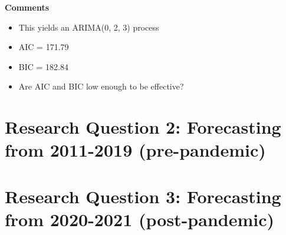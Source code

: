 \documentclass[
]{article}
\providecommand{\tightlist}{%
  \setlength{\itemsep}{0pt}\setlength{\parskip}{0pt}}
\begin{document}
\textbf{Comments}

\begin{itemize}
\tightlist
\item
  This yields an ARIMA(0, 2, 3) process
\item
  AIC = 171.79
\item
  BIC = 182.84
\item
  Are AIC and BIC low enough to be effective?
\end{itemize}

\hypertarget{research-question-2-forecasting-from-2011-2019-pre-pandemic}{%
\section{Research Question 2: Forecasting from 2011-2019
(pre-pandemic)}\label{research-question-2-forecasting-from-2011-2019-pre-pandemic}}

\hypertarget{research-question-3-forecasting-from-2020-2021-post-pandemic}{%
\section{Research Question 3: Forecasting from 2020-2021
(post-pandemic)}\label{research-question-3-forecasting-from-2020-2021-post-pandemic}}
\end{document}
